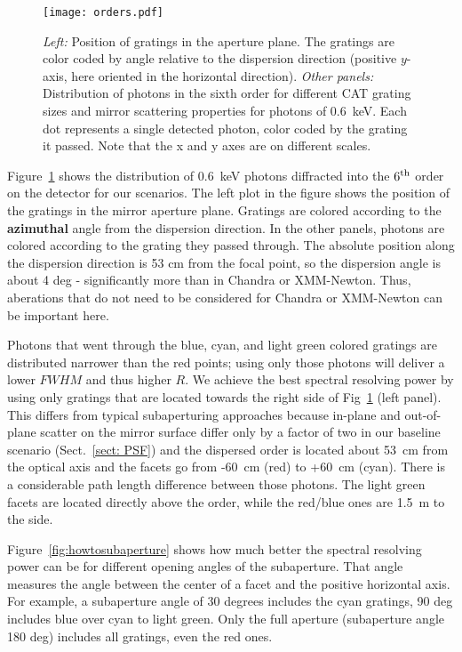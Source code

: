 \documentclass[12pt]{spieman}  %
\begin{document}
\begin{spacing}{1}
\begin{figure} [ht]
\begin{center}
\texttt{[image: orders.pdf]}
\end{center}
\caption {\label{fig:orders}
  \emph{Left:} Position of gratings in the aperture plane. The gratings are color coded by angle relative to the dispersion direction (positive $y$-axis, here oriented in the horizontal direction).
  \emph{Other panels:} Distribution of photons in the sixth order for different CAT grating sizes and mirror scattering properties for photons of 0.6~keV. Each dot represents a single detected photon, color coded by the grating it passed. Note that the x and y axes are on different scales.
}
\end{figure}

Figure~\ref{fig:orders} shows the distribution of 0.6~keV photons diffracted
into the $6^{\rm th}$ order on the detector for our scenarios.
The left plot in the figure shows the position
of the gratings in the mirror aperture plane. Gratings are colored according to the
\textbf{azimuthal} angle from the dispersion direction. In the other panels, photons are
colored according to the grating they passed through.
The absolute position along the dispersion direction is 53 cm from the focal point, so the dispersion angle is about 4 deg - significantly more than in Chandra or XMM-Newton. Thus, aberations that do not need to be considered for Chandra or XMM-Newton can be important here.

Photons that went through the blue, cyan, and light green colored gratings are distributed narrower than the red points; using only those photons will deliver a lower $FWHM$ and thus higher $R$. We achieve the best spectral resolving power by using only gratings that are located towards the right side of Fig~\ref{fig:orders} (left panel). This differs from typical subaperturing approaches because in-plane and out-of-plane scatter on the mirror surface differ only by a factor of two in our baseline scenario (Sect.~\ref{sect: PSF}) and the dispersed order is located about 53~cm from the optical axis and the facets go from -60~cm (red) to +60~cm (cyan). There is a considerable path length difference between those photons. The light green facets are located directly above the order, while the red/blue ones are 1.5~m to the side.

Figure~\ref{fig:howtosubaperture} shows how much better the spectral resolving power can be for different opening angles of the subaperture. That angle measures the angle between the center of a facet and the positive horizontal axis. For example, a subaperture angle of 30 degrees includes the cyan gratings, 90 deg includes blue over cyan to light green. Only the full aperture (subaperture angle 180 deg) includes all gratings, even the red ones.


\end{spacing}
\end{document}
